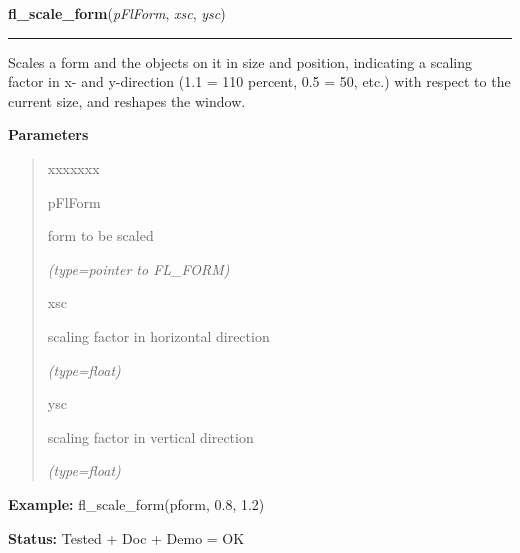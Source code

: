 \hspace{.8\funcindent}\begin{boxedminipage}{\funcwidth}

    \raggedright \textbf{fl\_scale\_form}(\textit{pFlForm}, \textit{xsc}, \textit{ysc})

    \vspace{-1.5ex}

    \rule{\textwidth}{0.5\fboxrule}
\setlength{\parskip}{2ex}
    Scales a form and the objects on it in size and position, indicating a 
    scaling factor in x- and y-direction (1.1 = 110 percent, 0.5 = 50, 
    etc.) with respect to the current size, and reshapes the window.

\setlength{\parskip}{1ex}
      \textbf{Parameters}
      \vspace{-1ex}

      \begin{quote}
        \begin{Ventry}{xxxxxxx}

          \item[pFlForm]

          form to be scaled

            {\it (type=pointer to FL\_FORM)}

          \item[xsc]

          scaling factor in horizontal direction

            {\it (type=float)}

          \item[ysc]

          scaling factor in vertical direction

            {\it (type=float)}

        \end{Ventry}

      \end{quote}

\textbf{Example:} fl\_scale\_form(pform, 0.8, 1.2)



\textbf{Status:} Tested + Doc + Demo = OK



    \end{boxedminipage}

    \label{xformslib:flbasic:fl_set_form_position}

